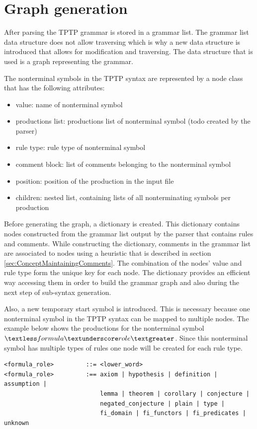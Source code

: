 \section{Graph generation}\label{sec:ConceptGraphGeneration}
After parsing the TPTP grammar is stored in a grammar list. The grammar list data structure does not allow traversing which is why a new data structure is introduced that allows for modification and traversing.
The data structure that is used is a graph representing the grammar.

The nonterminal symbols in the TPTP syntax are represented by a node class that has the following attributes:
\begin{itemize}
\item value: name of nonterminal symbol
\item productions list: productions list of nonterminal symbol (todo created by the parser)
\item rule type: rule type of nonterminal symbol
\item comment block: list of comments belonging to the nonterminal symbol
\item position: position of the production in the input file
\item children: nested list, containing lists of all nonterminating symbols per production
\end{itemize}

Before generating the graph, a dictionary is created.
This dictionary contains nodes constructed from the grammar list output by the parser that contains rules and comments.
While constructing the dictionary, comments in the grammar list are associated to nodes using a heuristic that is described in section \ref{sec:ConceptMaintainingComments}.
The combination of the nodes' value and rule type form the unique key for each node.
The dictionary provides an efficient way accessing them in order to build the grammar graph and also during the next step of sub-syntax generation.

Also, a new temporary start symbol is introduced.
This is necessary because one nonterminal symbol in the TPTP syntax can be mapped to multiple nodes.
The example below shows the productions for the nonterminal symbol $\textless formula\textunderscore role\textgreater$.
Since this nonterminal symbol has multiple types of rules one node will be created for each rule type.

\begin{verbatim}
<formula_role>         ::= <lower_word>
<formula_role>         :== axiom | hypothesis | definition | assumption |
                           lemma | theorem | corollary | conjecture |
                           negated_conjecture | plain | type |
                           fi_domain | fi_functors | fi_predicates | unknown
\end{verbatim}

